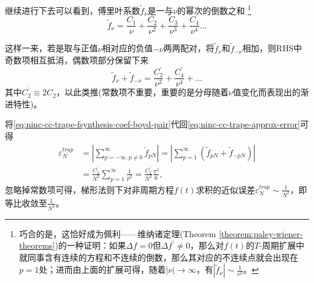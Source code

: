 继续进行下去可以看到，傅里叶系数$\tilde{f}_{\nu}$是一与$\nu$的幂次的倒数之和
\footnote{巧合的是，这恰好成为佩利——维纳诸定理(Theorem \ref{theorem:paley-wiener-theorems})的一种证明：如果$\Delta f=0$但$\Delta f^{'} \neq 0$，那么对$f(t)$的$T$-周期扩展中就同事含有连续的方程和不连续的倒数，那么其对应的不连续点就会出现在$p=1$处；进而由上面的扩展可得，随着$\left| \nu \right| \rightarrow \infty$，有$\left| \tilde{f}_{\nu} \right| \sim \frac{1}{\nu^{2}}$。
}
\begin{equation}
  \label{eq:ninc-cc-trape-fsynthesis-coef-boyd}
  \tilde{f}_{\nu} = \frac{C_{1}}{\nu}
  + \frac{C_{2}}{\nu^{2}}
  + \frac{C_{3}}{\nu^{3}}
  + \frac{C_{4}}{\nu^{4}} \ldots
\end{equation}

这样一来，若是取与正值$\nu$相对应的负值$- \nu$两两配对，将$\tilde{f}_{\nu}$和$\tilde{f}_{- \nu}$相加，则RHS中奇数项相互抵消，偶数项部分保留下来
\begin{equation}
  \label{eq:ninc-cc-trape-fsynthesis-coef-boyd-pair}
  \tilde{f}_{\nu} + \tilde{f}_{- \nu} =
  \frac{C^{'}_{2}}{\nu^{2}} + \frac{C^{'}_{4}}{\nu^{4}} + \ldots
\end{equation}
其中$C^{'}_{2} \equiv 2 C_{2}$，以此类推(常数项不重要，重要的是分母随着$\nu$值变化而表现出的渐进特性)。

将\eqref{eq:ninc-cc-trape-fsynthesis-coef-boyd-pair}代回\eqref{eq:ninc-cc-trape-approx-error}可得
\begin{equation*}
\begin{split}
    \varepsilon_{N}^{trap} & =  \left| \sum_{p = -\infty, p \neq 0}^{\infty} \tilde{f}_{p N} \right| =
    \left| \sum_{p = 1}^{\infty} \left( \tilde{f}_{p N} + \tilde{f}_{- p N} \right) \right| \\
    & = \frac{C^{'}_{2}}{N^{2}} \sum_{p=1}^{\infty} \frac{1}{p^{2}} = \frac{C^{'}_{2}}{N^{2}} \frac{\pi^{2}}{6},
\end{split}
\end{equation*}
忽略掉常数项可得，梯形法则下对非周期方程$f(t)$求积的近似误差$\varepsilon_{N}^{trap} \sim \frac{1}{N^{2}}$，即等比收敛至$\frac{1}{N^{2}}$。
